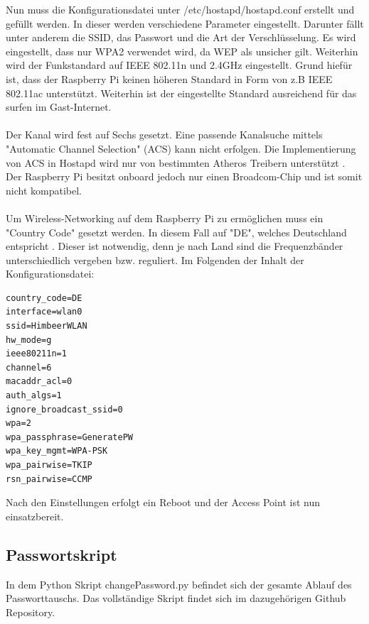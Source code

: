 \documentclass[a4paper,11pt,singlespacing]{article}
\begin{document}
                    Nun muss die Konfigurationsdatei unter /etc/hostapd/hostapd.conf erstellt und gefüllt werden.
                    In dieser werden verschiedene Parameter eingestellt. Darunter fällt unter anderem die SSID, das Passwort und die Art der Verschlüsselung. Es wird eingestellt, dass nur WPA2 verwendet wird, da WEP als unsicher gilt. Weiterhin wird der Funkstandard auf IEEE 802.11n und 2.4GHz eingestellt. Grund hiefür ist, dass der Raspberry Pi keinen höheren Standard in Form von z.B IEEE 802.11ac unterstützt. Weiterhin ist der eingestellte Standard ausreichend für das surfen im Gast-Internet. \\\\
                    Der Kanal wird fest auf Sechs gesetzt. Eine passende Kanalsuche mittels "Automatic Channel Selection" (ACS) \cite{Quote_hostapdACS} kann nicht erfolgen. Die Implementierung von ACS in Hostapd wird nur von bestimmten Atheros Treibern unterstützt \cite{Quote_hostapdACS}. Der Raspberry Pi besitzt onboard jedoch nur einen Broadcom-Chip  \cite{Quote_Raspberrypi3b} und ist somit nicht kompatibel. \\\\
                    Um Wireless-Networking auf dem Raspberry Pi zu ermöglichen muss ein "Country Code" gesetzt werden. In diesem Fall auf "DE", welches Deutschland entspricht \cite{Quote_hostapdDE}. Dieser ist notwendig, denn je nach Land sind die Frequenzbänder unterschiedlich vergeben bzw. reguliert. Im Folgenden der Inhalt der Konfigurationsdatei:\\
 
                
                    \begin{lstlisting}
country_code=DE
interface=wlan0
ssid=HimbeerWLAN
hw_mode=g
ieee80211n=1
channel=6
macaddr_acl=0
auth_algs=1
ignore_broadcast_ssid=0
wpa=2
wpa_passphrase=GeneratePW
wpa_key_mgmt=WPA-PSK
wpa_pairwise=TKIP
rsn_pairwise=CCMP
                    \end{lstlisting} 
                   
                   Nach den Einstellungen erfolgt ein Reboot und der Access Point ist nun einsatzbereit.
                
     \subsection{Passwortskript}           
            In dem Python Skript changePassword.py befindet sich der gesamte Ablauf des Passworttauschs.  Das vollständige Skript findet sich im dazugehörigen Github Repository.\cite{Quote_github_repo}
            
\end{document}

